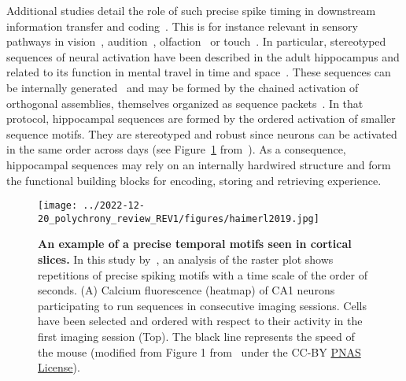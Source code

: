 \documentclass[brainsci, %
               review,submit,pdftex,moreauthors
               ]{Definitions/mdpi}
\begin{document}
Additional studies detail the role of such precise spike timing in downstream information transfer and coding~\citep{villette_internally_2015,branco_dendritic_2010,luczak_packet-based_2015}. This is for instance relevant in sensory pathways in vision~\citep{meister_concerted_1995}, audition~\citep{decharms_primary_1996}, olfaction~\citep{cleland_construction_2014, kashiwadani_synchronized_1999, rinberg_speed-accuracy_2006} or touch~\citep{johansson_first_2004}.  In particular, stereotyped sequences of neural activation have been described in the adult hippocampus and related to its function in mental travel in time and space~\citep{buzsaki_space_2018}. These sequences can be internally generated~\citep{pastalkova_internally_2008,villette_internally_2015} and may be formed by the chained activation of orthogonal assemblies, themselves organized as sequence packets~\citep{malvache_awake_2016}. In that protocol, hippocampal sequences are formed by the ordered activation of smaller sequence motifs. They are stereotyped and robust since neurons can be activated in the same order across days (see Figure~\ref{fig:haimerl} from~\citep{haimerl_internal_2019}). As a consequence, hippocampal sequences may rely on an internally hardwired structure and form the functional building blocks for encoding, storing and retrieving experience.
%
\begin{figure}
\centering
\texttt{[image: ../2022-12-20\_polychrony\_review\_REV1/figures/haimerl2019.jpg]}
\caption{\textbf{An example of a precise temporal motifs seen in cortical slices.} In this study by~\citep{haimerl_internal_2019}, an analysis of the raster plot shows repetitions of precise spiking motifs with a time scale of the order of seconds. (A) Calcium fluorescence (heatmap) of CA1 neurons participating to run sequences in consecutive imaging sessions. Cells have been selected and ordered with respect to their activity in the first imaging session (Top). The black line represents the speed of the mouse (modified from Figure 1 from~\citep{haimerl_internal_2019} under the CC-BY \href{https://www.pnas.org/doi/full/10.1073/pnas.1718518116}{PNAS License}).}\label{fig:haimerl}
\end{figure}
\end{document}
